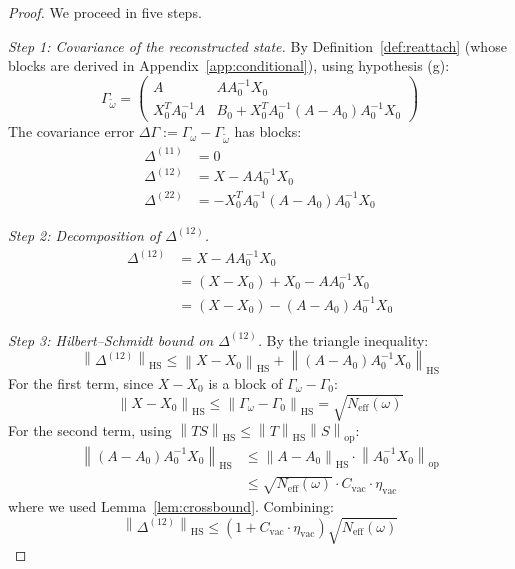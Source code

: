 \documentclass[11pt,a4paper]{article}
\theoremstyle{plain}
\theoremstyle{definition}
\theoremstyle{remark}
\newcommand{\opnorm}[1]{\left\lVert #1 \right\rVert_{\mathrm{op}}}
\newcommand{\hsnorm}[1]{\left\lVert #1 \right\rVert_{\mathrm{HS}}}
\newcommand{\etavac}{\eta_{\mathrm{vac}}}
\newcommand{\Cvac}{C_{\mathrm{vac}}}
\newcommand{\Neff}{N_{\mathrm{eff}}}
\begin{document}
\begin{proof}
We proceed in five steps.

\emph{Step 1: Covariance of the reconstructed state.} By
Definition~\ref{def:reattach} (whose blocks are derived in
Appendix~\ref{app:conditional}), using hypothesis (g):
\begin{equation}
\Gamma_{\tilde{\omega}} = \begin{pmatrix}
A & A A_0^{-1} X_0 \\
X_0^T A_0^{-1} A & B_0 + X_0^T A_0^{-1}(A - A_0)A_0^{-1} X_0
\end{pmatrix}
\end{equation}
The covariance error $\Delta\Gamma := \Gamma_\omega - \Gamma_{\tilde{\omega}}$ has
blocks:
\begin{align}
\Delta^{(11)} &= 0 \\
\Delta^{(12)} &= X - A A_0^{-1} X_0 \\
\Delta^{(22)} &= -X_0^T A_0^{-1}(A - A_0)A_0^{-1} X_0
\end{align}

\emph{Step 2: Decomposition of $\Delta^{(12)}$.}
\begin{align}
\Delta^{(12)} &= X - A A_0^{-1} X_0 \\
&= (X - X_0) + X_0 - A A_0^{-1} X_0 \\
&= (X - X_0) - (A - A_0)A_0^{-1} X_0
\end{align}

\emph{Step 3: Hilbert--Schmidt bound on $\Delta^{(12)}$.} By the triangle
inequality:
\begin{equation}
\hsnorm{\Delta^{(12)}} \le \hsnorm{X - X_0} + \hsnorm{(A - A_0)A_0^{-1} X_0}
\end{equation}
For the first term, since $X - X_0$ is a block of $\Gamma_\omega - \Gamma_0$:
\begin{equation}
\hsnorm{X - X_0} \le \hsnorm{\Gamma_\omega - \Gamma_0} = \sqrt{\Neff(\omega)}
\end{equation}
For the second term, using $\hsnorm{TS} \le \hsnorm{T}\opnorm{S}$:
\begin{align}
\hsnorm{(A - A_0)A_0^{-1} X_0}
&\le \hsnorm{A - A_0} \cdot \opnorm{A_0^{-1} X_0} \\
&\le \sqrt{\Neff(\omega)} \cdot \Cvac \cdot \etavac
\end{align}
where we used Lemma~\ref{lem:crossbound}. Combining:
\begin{equation}\label{eq:step3}
\hsnorm{\Delta^{(12)}} \le (1 + \Cvac \cdot \etavac)\sqrt{\Neff(\omega)}
\end{equation}


\end{proof}
\end{document}
